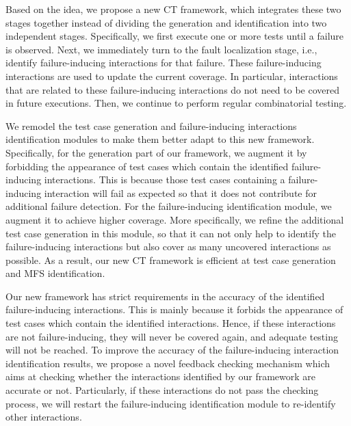 \documentclass[journal,12pt,onecolumn,draftclsnofoot,]{IEEEtran}
\begin{document}
Based on the idea, we propose a new CT framework, which integrates these two stages together instead of dividing the generation and identification into two independent stages. Specifically, we first execute one or more tests until a failure is observed. Next, we immediately turn to the fault localization stage, i.e., identify failure-inducing interactions for that failure. These failure-inducing interactions are used to update the current coverage. In particular, interactions that are related to these failure-inducing interactions do not need to be covered in future executions. Then, we continue to perform regular combinatorial testing.

We remodel the test case generation and failure-inducing interactions identification modules to make them better adapt to this new framework. Specifically, for the generation part of our framework, we augment it by forbidding the appearance of test cases which contain the identified failure-inducing interactions. This is because those test cases containing a failure-inducing interaction will fail as expected so that {\color{red}it does not contribute for additional failure detection}. For the failure-inducing identification module, we augment it {\color{red}to achieve} higher coverage.  More specifically, we refine the additional test case generation in this module, so that it can not only help to identify the failure-inducing interactions but also cover as many uncovered interactions as possible.
{\color{red}As a result, our new CT framework is efficient at test case generation and MFS identification.}


Our new framework has strict requirements in the accuracy of the identified failure-inducing interactions. This is mainly because it forbids the appearance of test cases which contain the identified interactions. Hence, if these interactions are not failure-inducing, they will never be covered again, and adequate testing will not be reached.
To improve the accuracy of the failure-inducing interaction identification results, we propose a novel feedback checking mechanism which aims at checking whether the interactions identified by our framework are accurate or not. Particularly, if these interactions do not pass the checking process, we will restart the failure-inducing identification module to re-identify other interactions.
\end{document}
